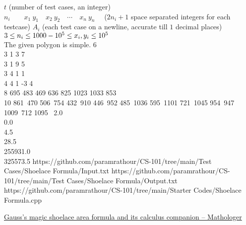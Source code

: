 \documentclass[../../Problems]{subfiles}
\begin{document}
\begin{testcasesMore}
	{$t$ \hfill(number of test cases, an integer)\\
	$n_i\qquad x_1\ y_1\quad x_2\ y_2\quad \cdots\quad  x_n\ y_n\quad$ \hfill($2n_i+1$ space separated integers for each testcase)}
	{$A_{i}$ \hfill(each test case on a newline, accurate till $1$ decimal places)}
	{$3 \leq n_i \leq 1000\\ -10^5 \leq x_i, y_i \leq 10^5$\\
	The given polygon is simple.}
	{6\\3 1 3 7\\3 1 9 5\\3 4 1 1\\4 4 1 -3 4\\8 695 483 469 636 825 1023 1033 853\quad\\10 861\ 470 506\ 754 432\ 910 446\ 952 485\ 1036  595\ 1101 721\ 1045 954\ 947 1009\ 712 1095\ }
	{2.0\\0.0\\4.5\\28.5\\255931.0\\325573.5}
	{https://github.com/paramrathour/CS-101/tree/main/Test Cases/Shoelace Formula/Input.txt}
	{https://github.com/paramrathour/CS-101/tree/main/Test Cases/Shoelace Formula/Output.txt}
	{https://github.com/paramrathour/CS-101/tree/main/Starter Codes/Shoelace Formula.cpp}
\end{testcasesMore}
\begin{funvideo}
\href{https://youtu.be/0KjG8Pg6LGk}{Gauss's magic shoelace area formula and its calculus companion -- Mathologer}
\end{funvideo}
\end{document}
